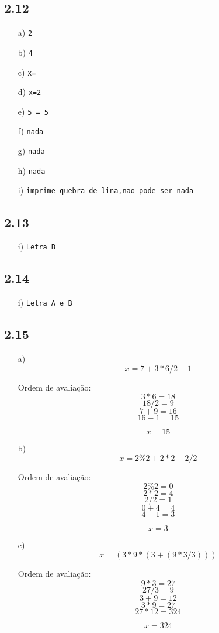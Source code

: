\documentclass[a4paper,12pt]{article}
\begin{document}
\subsection*{2.12}
\begin{enumerate}
    \item[a)] \texttt{2}
    \item[b)] \texttt{4}
    \item[c)] \texttt{x=}
    \item[d)] \texttt{x=2}
    \item[e)] \texttt{5 = 5}
    \item[f)] \texttt{nada}
    \item[g)] \texttt{nada}
    \item[h)] \texttt{nada}
    \item[i)] \texttt{imprime quebra de lina,nao pode ser nada}
\end{enumerate}
\subsection*{2.13}
\begin{enumerate}
    \item[i)] \texttt{Letra B}
\end{enumerate}
\subsection*{2.14}
\begin{enumerate}
    \item[i)] \texttt{Letra A e B}
\end{enumerate}
\subsection*{2.15}
\begin{enumerate}
    \item[a)] 
    \[
    x = 7 + 3 * 6 / 2 - 1
    \]

    Ordem de avaliação:
    \[
    3 * 6 = 18
    \]
    \[
    18 / 2 = 9
    \]
    \[
    7 + 9 = 16
    \]
    \[
    16 - 1 = 15
    \]

    \[
    \boxed{x = 15}
    \]

    \item[b)] 
    \[
    x = 2 \% 2 + 2 * 2 - 2 / 2
    \]

    Ordem de avaliação:
    \[
    2 \% 2 = 0
    \]
    \[
    2 * 2 = 4
    \]
    \[
    2 / 2 = 1
    \]
    \[
    0 + 4 = 4
    \]
    \[
    4 - 1 = 3
    \]

    \[
    \boxed{x = 3}
    \]

    \item[c)] 
    \[
    x = (3 * 9 * (3 + (9 * 3 / 3)))
    \]

    Ordem de avaliação:
    \[
    9 * 3 = 27
    \]
    \[
    27 / 3 = 9
    \]
    \[
    3 + 9 = 12
    \]
    \[
    3 * 9 = 27
    \]
    \[
    27 * 12 = 324
    \]

    \[
    \boxed{x = 324}
    \]
\end{enumerate}
\end{document}
